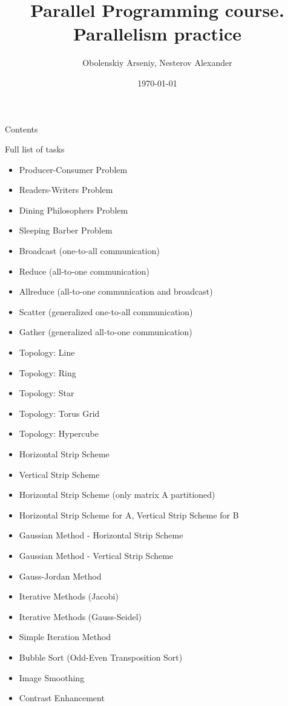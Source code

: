 \documentclass{beamer}
\title[Parallel Programming. Parallelism practice]{Parallel Programming course. Parallelism practice}
\author{Obolenskiy Arseniy, Nesterov Alexander}
\institute{Nizhny Novgorod State University}
\date{\today} %
\begin{document}
\begin{frame}
    \titlepage
\end{frame}

\begin{frame}{Contents}
    \tableofcontents
\end{frame}

\begin{frame}{Full list of tasks}
  \tiny
  \begin{itemize}
    \item Producer-Consumer Problem
    \item Readers-Writers Problem
    \item Dining Philosophers Problem
    \item Sleeping Barber Problem
    \item Broadcast (one-to-all communication)
    \item Reduce (all-to-one communication)
    \item Allreduce (all-to-one communication and broadcast)
    \item Scatter (generalized one-to-all communication)
    \item Gather (generalized all-to-one communication)
    \item Topology: Line
    \item Topology: Ring
    \item Topology: Star
    \item Topology: Torus Grid
    \item Topology: Hypercube
    \item Horizontal Strip Scheme
    \item Vertical Strip Scheme
    \item Horizontal Strip Scheme (only matrix A partitioned)
    \item Horizontal Strip Scheme for A, Vertical Strip Scheme for B
    \item Gaussian Method - Horizontal Strip Scheme
    \item Gaussian Method - Vertical Strip Scheme
    \item Gauss-Jordan Method
    \item Iterative Methods (Jacobi)
    \item Iterative Methods (Gauss-Seidel)
    \item Simple Iteration Method
    \item Bubble Sort (Odd-Even Transposition Sort)
    \item Image Smoothing
    \item Contrast Enhancement
  \end{itemize}
\end{frame}
\end{document}
